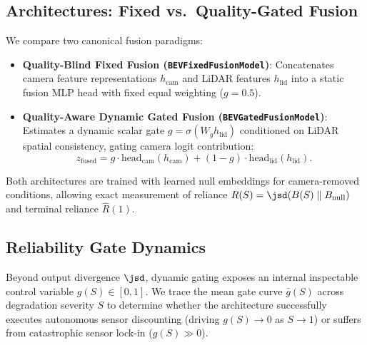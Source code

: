 \subsection{Architectures: Fixed vs.\ Quality-Gated Fusion}
We compare two canonical fusion paradigms:
\begin{itemize}
    \item \textbf{Quality-Blind Fixed Fusion (\texttt{BEVFixedFusionModel})}: Concatenates camera feature representations $h_{\text{cam}}$ and LiDAR features $h_{\text{lid}}$ into a static fusion MLP head with fixed equal weighting ($g=0.5$).
    \item \textbf{Quality-Aware Dynamic Gated Fusion (\texttt{BEVGatedFusionModel})}: Estimates a dynamic scalar gate $g = \sigma(W_g h_{\text{lid}})$ conditioned on LiDAR spatial consistency, gating camera logit contribution:
    \begin{equation}
        z_{\text{fused}} = g \cdot \text{head}_{\text{cam}}(h_{\text{cam}}) + (1 - g) \cdot \text{head}_{\text{lid}}(h_{\text{lid}}).
    \end{equation}
\end{itemize}
Both architectures are trained with learned null embeddings for camera-removed conditions, allowing exact measurement of reliance $R(S) = \jsd(B(S) \parallel B_{\text{null}})$ and terminal reliance $\hat{R}(1)$.

\subsection{Reliability Gate Dynamics}
Beyond output divergence $\jsd$, dynamic gating exposes an internal inspectable control variable $g(S) \in [0, 1]$. We trace the mean gate curve $\bar{g}(S)$ across degradation severity $S$ to determine whether the architecture successfully executes autonomous sensor discounting (driving $g(S) \to 0$ as $S \to 1$) or suffers from catastrophic sensor lock-in ($g(S) \gg 0$).

